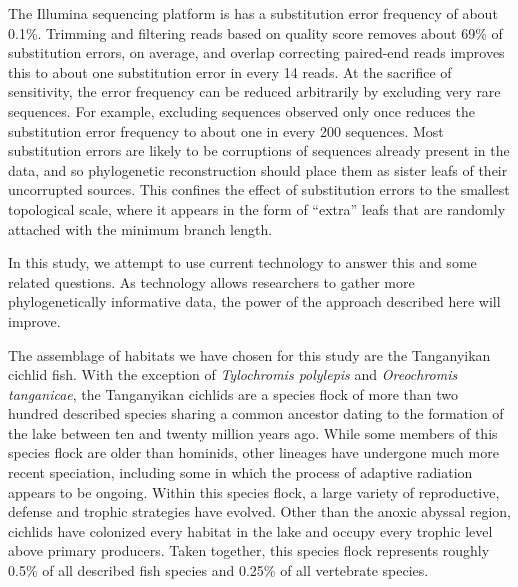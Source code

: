 The Illumina sequencing platform is has a substitution error frequency of about 0.1\%. \cite{ross2013characterizing} Trimming and filtering reads based on quality score removes about 69\% of substitution errors, on average, \cite{schirmer2016illumina} and overlap correcting paired-end reads improves this to about one substitution error in every 14 reads. \cite{bolger2014trimmomatic} At the sacrifice of sensitivity, the error frequency can be reduced arbitrarily by excluding very rare sequences. For example, excluding sequences observed only once reduces the substitution error frequency to about one in every 200 sequences. Most substitution errors are likely to be corruptions of sequences already present in the data, and so phylogenetic reconstruction should place them as sister leafs of their uncorrupted sources. This confines the effect of substitution errors to the smallest topological scale, where it appears in the form of ``extra'' leafs that are randomly attached with the minimum branch length.

In this study, we attempt to use current technology to answer this and some related questions. As technology allows researchers to gather more phylogenetically informative data, the power of the approach described here will improve. 

The assemblage of habitats we have chosen for this study are the Tanganyikan cichlid fish. With the exception of {\em Tylochromis polylepis} and {\em Oreochromis tanganicae}, the Tanganyikan cichlids are a species flock of more than two hundred described species sharing a common ancestor dating to the formation of the lake between ten and twenty million years ago. While some members of this species flock are older than hominids, other lineages have undergone much more recent speciation, including some in which the process of adaptive radiation appears to be ongoing. Within this species flock, a large variety of reproductive, defense and trophic strategies have evolved. Other than the anoxic abyssal region, cichlids have colonized every habitat in the lake and occupy every trophic level above primary producers. Taken together, this species flock represents roughly 0.5\% of all described fish species and 0.25\% of all vertebrate species.